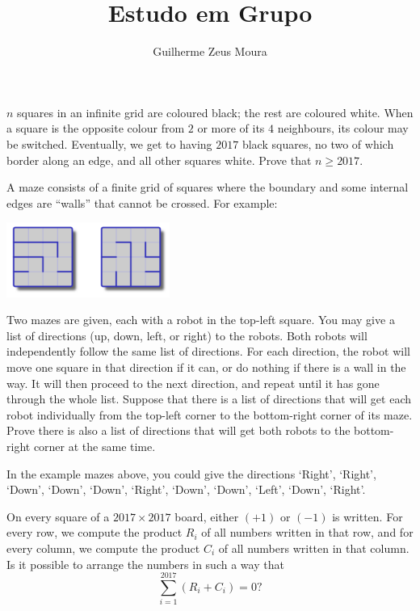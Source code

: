 \documentclass[10pt, a4paper]{article}
\title{Estudo em Grupo}
\author{Guilherme Zeus Moura}
\begin{document}
	
	\zeustitle

	\begin{prob}
		$n$ squares in an infinite grid are coloured black; the rest are coloured white. When a square is the opposite colour from $2$ or more of its $4$ neighbours, its colour may be switched. Eventually, we get to having $2017$ black squares, no two of which border along an edge, and all other squares white. Prove that $n \ge 2017$.
	\end{prob}
	\begin{prob}
		A maze consists of a finite grid of squares where the boundary and some internal
edges are “walls” that cannot be crossed. For example:

	\begin{center}
		\includegraphics[width=0.4\textwidth]{pic.png}
	\end{center}
	Two mazes are given, each with a robot in the top-left square. You may give a list of directions (up, down, left, or right) to the robots. Both robots will independently follow the same list of directions. For each direction, the robot will move one square in that direction if it can, or do nothing if there is a wall in the way. It will then proceed to the next direction, and repeat until it has gone through the whole list. Suppose that there is a list of directions that will get each robot individually from the top-left corner to the bottom-right corner of its maze. Prove there is also a list of directions that will get both robots to the bottom-right corner at the same time.

	In the example mazes above, you could give the directions ‘Right’, ‘Right’, ‘Down’, ‘Down’, ‘Down’, ‘Right’, ‘Down’, ‘Down’, ‘Left’, ‘Down’, ‘Right’.
	\end{prob}
	\begin{prob}
		On every square of a $2017 \times 2017$ board, either $(+1)$ or $(-1)$ is written. For every row, we compute the product $R_i$ of all numbers written in that row, and for every column, we compute the product $C_i$ of all numbers written in that column. Is it possible to arrange the numbers in such
a way that \[ \sum_{i=1}^{2017} (R_i + C_i) = 0? \]
	\end{prob}
\end{document}

